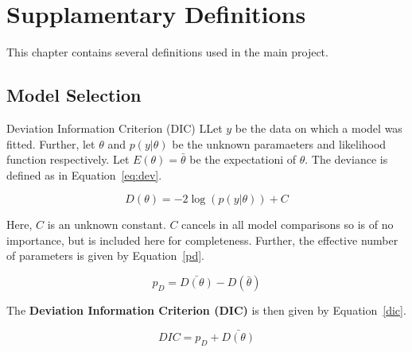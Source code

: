 \chapter{Supplamentary Definitions}\label{suppdefs}

This chapter contains several definitions used in the main project.

\section{Model Selection}

\begin{definition}{Deviation Information Criterion (DIC)}
LLet $y$ be the data on which a model was fitted. Further, let $\theta$ and $p(y|\theta)$ be the unknown paramaeters and likelihood function respectively. Let $E(\theta) = \bar{\theta}$ be the expectationi of $\theta$. The deviance is defined as in Equation~\ref{eq:dev}. 

\begin{equation}
    D(\theta) = -2\log(p(y|\theta)) + C
    \label{eq:dev}
\end{equation}

Here, $C$ is an unknown constant. $C$ cancels in all model comparisons so is of no importance, but is included here for completeness. Further, the effective number of parameters is given by Equation~\ref{pd}.

\begin{equation}
    p_D = \bar{D(\theta)} - D(\bar{\theta})
    \label{pd}
\end{equation}

The \textbf{Deviation Information Criterion (DIC)} is then given by Equation~\ref{dic}.

\begin{equation}
    DIC = p_D + \bar{D(\theta)}
    \label{dic}
\end{equation}
\label{def:dic}
\end{definition}

\\


